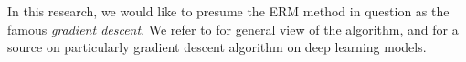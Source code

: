 \documentclass[10pt]{article}
\begin{document}
In this research, we would like to presume the ERM method in question as the famous \textit{gradient descent}. We refer to \cite{achlioptas_stochastic_nodate,ruder_overview_2017} for general view of the algorithm, and \cite{zhang_gradient_2019} for a source on particularly gradient descent algorithm on deep learning models. 

%
%
\end{document}
